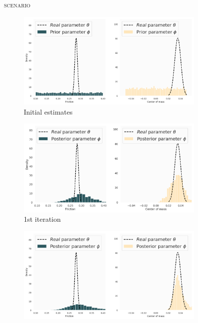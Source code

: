 \begin{figure}
\centering
\textsc{\MakeLowercase{\yp{} scenario}}\\
\medskip
\begin{subfigure}{0.45\textwidth}
  \includegraphics[width=\textwidth]{img/yumi/latent-representation/latent_encodings_iter0_style}
  \caption{Initial estimates}
\end{subfigure}
\begin{subfigure}{0.45\textwidth}
  \centering
  \includegraphics[width=\linewidth]{img/yumi/latent-representation/latent_encodings_iter1_style}
  \caption{1st iteration}
\end{subfigure}
\begin{subfigure}{0.45\textwidth}
  \centering
  \includegraphics[width=\linewidth]{img/yumi/latent-representation/latent_encodings_iter3_10_style_3.png}

\end{subfigure}
\end{figure}
